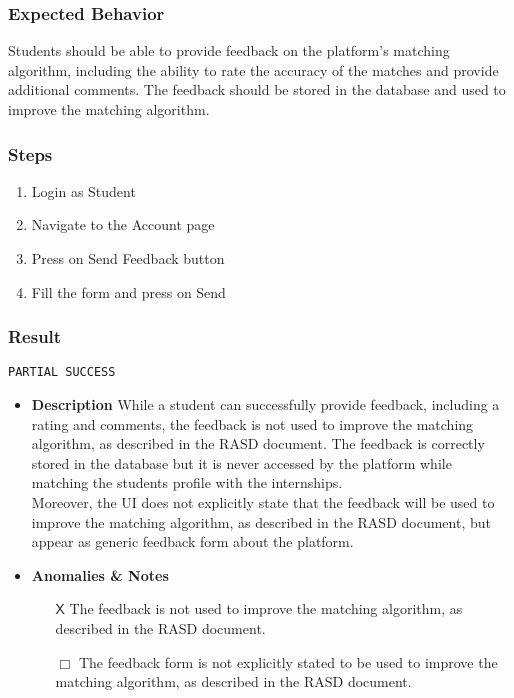 \subsubsection{Expected Behavior}
Students should be able to provide feedback on the platform's matching algorithm, including the ability to rate the accuracy of the matches and provide additional comments. The feedback should be stored in the database and used to improve the matching algorithm.
\subsubsection{Steps}
\begin{enumerate}
    \item Login as Student
    \item Navigate to the Account page
    \item Press on Send Feedback button
    \item Fill the form and press on Send
\end{enumerate}
\subsubsection{Result}
\verb|PARTIAL SUCCESS|
\begin{itemize}
    \item \textbf{\color{titleColor} Description}
    While a student can successfully provide feedback, including a rating and comments, the feedback is not used to improve the matching algorithm, as described in the RASD document. The feedback is correctly stored in the database but it is never accessed by the platform while matching the students profile with the internships.\\ Moreover, the UI does not explicitly state that the feedback will be used to improve the matching algorithm, as described in the RASD document, but appear as generic feedback form about the platform.
    \item \textbf{\color{titleColor} Anomalies \& Notes}
    \begin{itemize}
        \item [{\color{titleColor}\(\mathsf{X}\)}] The feedback is not used to improve the matching algorithm, as described in the RASD document.
        \item [{\color{titleColor}\(\Box \)}] The feedback form is not explicitly stated to be used to improve the matching algorithm, as described in the RASD document.
    \end{itemize}
\end{itemize}
